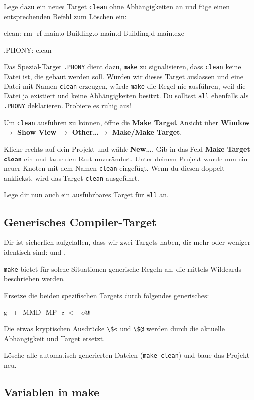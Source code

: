 Lege dazu ein neues Target \texttt{clean} ohne Abhängigkeiten an und füge einen entsprechenden Befehl zum Löschen ein:
\begin{lstmake}
clean:
    rm -rf main.o Building.o main.d Building.d main.exe

.PHONY: clean
\end{lstmake}
Das Spezial-Target \texttt{.PHONY} dient dazu, \texttt{make} zu signalisieren, dass \texttt{clean} keine Datei ist, die gebaut werden soll.
Würden wir dieses Target auslassen und eine Datei mit Namen \texttt{clean} erzeugen, würde \texttt{make} die Regel nie ausführen, weil die Datei ja existiert und keine Abhängigkeiten besitzt.
Du solltest \texttt{all} ebenfalls als \texttt{.PHONY} deklarieren.
Probiere es ruhig aus!

Um \texttt{clean} ausführen zu können, öffne die \textbf{Make Target} Ansicht über \textbf{Window $\to$ Show View $\to$ Other\dots $\to$ Make/Make Target}.

Klicke rechts auf dein Projekt und wähle \textbf{New\dots}.
Gib in das Feld \textbf{Make Target} \textbf{\lstinline{clean}} ein und lasse den Rest unverändert.
Unter deinem Projekt wurde nun ein neuer Knoten mit dem Namen \texttt{clean} eingefügt.
Wenn du diesen doppelt anklickst, wird das Target \texttt{clean} ausgeführt.

Lege dir nun auch ein ausführbares Target für \texttt{all} an.

\subsection{Generisches Compiler-Target}

Dir ist sicherlich aufgefallen, dass wir zwei Targets haben, die mehr oder weniger identisch sind:  und .

\texttt{make} bietet für solche Situationen generische Regeln an, die mittels Wildcards beschrieben werden.

Ersetze die beiden spezifischen Targets durch folgendes generisches:
\begin{lstmake}
    g++ -MMD -MP -c $< -o $@
\end{lstmake}
Die etwas kryptischen Ausdrücke \lstinline{\$<} und \lstinline{\$@} werden durch die aktuelle Abhängigkeit und Target ersetzt.

Lösche alle automatisch generierten Dateien (\texttt{make clean}) und baue das Projekt neu.

\subsection{Variablen in make}

